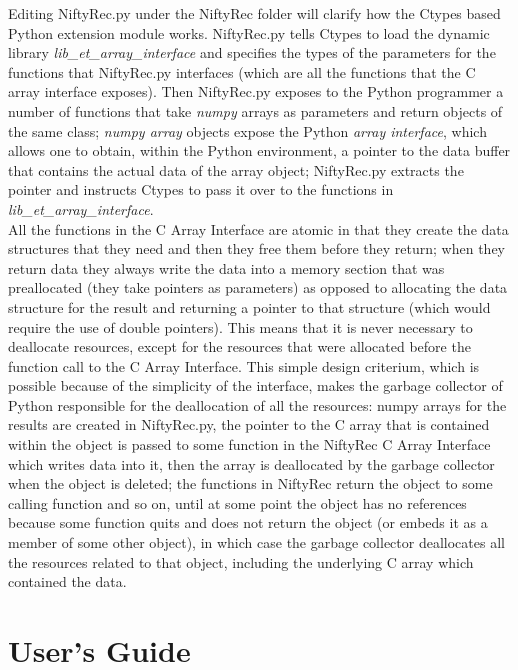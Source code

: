 \documentclass[12pt,a4paper]{report}
\begin{document}
Editing NiftyRec.py under the NiftyRec folder will clarify how the Ctypes based Python extension module works. 
NiftyRec.py tells Ctypes to load the dynamic library \emph{lib\_et\_array\_interface} and specifies the types of the 
parameters for the functions that NiftyRec.py interfaces (which are all the functions that the C array interface exposes). 
Then NiftyRec.py exposes to the Python programmer a number of functions that take \emph{numpy} arrays as parameters and return 
objects of the same class; \emph{numpy array} objects expose the Python \emph{array interface}, which allows one to obtain, within the 
Python environment, a pointer to the data buffer that contains the actual data of the array object; NiftyRec.py extracts the pointer 
and instructs Ctypes to pass it over to the functions in \emph{lib\_et\_array\_interface}. \\
All the functions in the C Array Interface are atomic in that they create the data structures that they need and then 
they free them before they return; when they return data they always write the data into a memory section that was preallocated (they take pointers 
as parameters) as opposed to allocating the data structure for the result and returning a pointer to that structure (which would require the use of double 
pointers). This means that it is never necessary to deallocate resources, except for the resources that were allocated before the function call to the C Array Interface. 
This simple design criterium, which is possible because of the simplicity of the interface, makes the garbage collector of Python responsible for the deallocation of all 
the resources: numpy arrays for the results are created in NiftyRec.py, the pointer to the C array that is contained within the object is passed to 
some function in the NiftyRec C Array Interface which writes data into it, then the array is deallocated by the garbage collector when the object is deleted; the functions 
in NiftyRec return the object to some calling function and so on, until at some point the object has no references because some function quits and does not return 
the object (or embeds it as a member of some other object), in which case the garbage collector deallocates all the resources related to that object, including the underlying 
C array which contained the data. 



\chapter{User's Guide}
\end{document}
